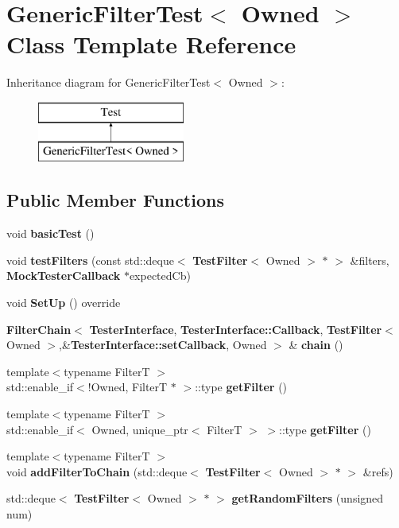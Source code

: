 \section{Generic\+Filter\+Test$<$ Owned $>$ Class Template Reference}
\label{classGenericFilterTest}
Inheritance diagram for Generic\+Filter\+Test$<$ Owned $>$\+:\begin{figure}[H]
\begin{center}
\leavevmode
\includegraphics[height=2.000000cm]{classGenericFilterTest}
\end{center}
\end{figure}
\subsection*{Public Member Functions}
\begin{DoxyCompactItemize}
\item 
void {\bf basic\+Test} ()
\item 
void {\bf test\+Filters} (const std\+::deque$<$ {\bf Test\+Filter}$<$ Owned $>$ $\ast$ $>$ \&filters, {\bf Mock\+Tester\+Callback} $\ast$expected\+Cb)
\item 
void {\bf Set\+Up} () override
\item 
{\bf Filter\+Chain}$<$ {\bf Tester\+Interface}, {\bf Tester\+Interface\+::\+Callback}, {\bf Test\+Filter}$<$ Owned $>$,\&{\bf Tester\+Interface\+::set\+Callback}, Owned $>$ \& {\bf chain} ()
\item 
{\footnotesize template$<$typename FilterT $>$ }\\std\+::enable\+\_\+if$<$!Owned, FilterT $\ast$ $>$\+::type {\bf get\+Filter} ()
\item 
{\footnotesize template$<$typename FilterT $>$ }\\std\+::enable\+\_\+if$<$ Owned, unique\+\_\+ptr$<$ FilterT $>$ $>$\+::type {\bf get\+Filter} ()
\item 
{\footnotesize template$<$typename FilterT $>$ }\\void {\bf add\+Filter\+To\+Chain} (std\+::deque$<$ {\bf Test\+Filter}$<$ Owned $>$ $\ast$ $>$ \&refs)
\item 
std\+::deque$<$ {\bf Test\+Filter}$<$ Owned $>$ $\ast$ $>$ {\bf get\+Random\+Filters} (unsigned num)
\end{DoxyCompactItemize}
